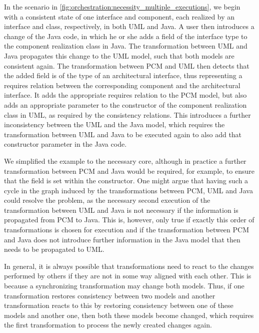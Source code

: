 In the scenario in \autoref{fig:orchestration:necessity_multiple_executions}, we begin with a consistent state of one interface and component, each realized by an interface and class, respectively, in both UML and Java.
A user then introduces a change of the Java code, in which he or she adds a field of the interface type to the component realization class in Java.
The transformation between UML and Java propagates this change to the UML model, such that both models are consistent again.
The transformation between \gls{PCM} and UML then detects that the added field is of the type of an architectural interface, thus representing a requires relation between the corresponding component and the architectural interface. 
It adds the appropriate requires relation to the \gls{PCM} model, but also adds an appropriate parameter to the constructor of the component realization class in UML, as required by the consistency relations.
This introduces a further inconsistency between the UML and the Java model, which requires the transformation between UML and Java to be executed again to also add that constructor parameter in the Java code.

We simplified the example to the necessary core, although in practice a further transformation between \gls{PCM} and Java would be required, for example, to ensure that the field is set within the constructor.
One might argue that having such a cycle in the graph induced by the transformations between \gls{PCM}, UML and Java could resolve the problem, as the necessary second execution of the transformation between UML and Java is not necessary if the information is propagated from \gls{PCM} to Java.
This is, however, only true if exactly this order of transformations is chosen for execution and if the transformation between \gls{PCM} and Java does not introduce further information in the Java model that then needs to be propagated to UML.

In general, it is always possible that transformations need to react to the changes performed by others if they are not in some way aligned with each other.
This is because a synchronizing transformation may change both models.
Thus, if one transformation restores consistency between two models and another transformation reacts to this by restoring consistency between one of these models and another one, then both these models become changed, which requires the first transformation to process the newly created changes again.

